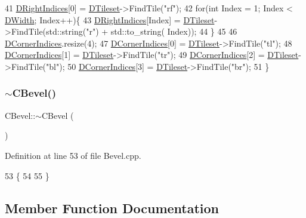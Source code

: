 \begin{DoxyCode}
41     \hyperlink{classCBevel_a52160856e5fbb45c4c1d6e433089ab05}{DRightIndices}[0] = \hyperlink{classCBevel_a98cbd98b79bc8cffd408f12fee447fb9}{DTileset}->FindTile(\textcolor{stringliteral}{"rf"});
42     \textcolor{keywordflow}{for}(\textcolor{keywordtype}{int} Index = 1; Index < \hyperlink{classCBevel_a891dccc1828c48e5e7a475ca33080060}{DWidth}; Index++)\{
43         \hyperlink{classCBevel_a52160856e5fbb45c4c1d6e433089ab05}{DRightIndices}[Index] = \hyperlink{classCBevel_a98cbd98b79bc8cffd408f12fee447fb9}{DTileset}->FindTile(std::string(\textcolor{stringliteral}{"r"}) + std::to\_string(
      Index));
44     \}
45     
46     \hyperlink{classCBevel_ab5e1c6e9de178bdfbdb87796945a289e}{DCornerIndices}.resize(4);
47     \hyperlink{classCBevel_ab5e1c6e9de178bdfbdb87796945a289e}{DCornerIndices}[0] = \hyperlink{classCBevel_a98cbd98b79bc8cffd408f12fee447fb9}{DTileset}->FindTile(\textcolor{stringliteral}{"tl"});
48     \hyperlink{classCBevel_ab5e1c6e9de178bdfbdb87796945a289e}{DCornerIndices}[1] = \hyperlink{classCBevel_a98cbd98b79bc8cffd408f12fee447fb9}{DTileset}->FindTile(\textcolor{stringliteral}{"tr"});
49     \hyperlink{classCBevel_ab5e1c6e9de178bdfbdb87796945a289e}{DCornerIndices}[2] = \hyperlink{classCBevel_a98cbd98b79bc8cffd408f12fee447fb9}{DTileset}->FindTile(\textcolor{stringliteral}{"bl"});
50     \hyperlink{classCBevel_ab5e1c6e9de178bdfbdb87796945a289e}{DCornerIndices}[3] = \hyperlink{classCBevel_a98cbd98b79bc8cffd408f12fee447fb9}{DTileset}->FindTile(\textcolor{stringliteral}{"br"});
51 \}
\end{DoxyCode}
\hypertarget{classCBevel_a52d29ce666c80b29dae9da0307270e68}{}\label{classCBevel_a52d29ce666c80b29dae9da0307270e68} 
\subsubsection{\texorpdfstring{$\sim$\+C\+Bevel()}{~CBevel()}}
{\footnotesize\ttfamily C\+Bevel\+::$\sim$\+C\+Bevel (\begin{DoxyParamCaption}{ }\end{DoxyParamCaption})}



Definition at line 53 of file Bevel.\+cpp.


\begin{DoxyCode}
53                \{
54     
55 \}
\end{DoxyCode}


\subsection{Member Function Documentation}
\hypertarget{classCBevel_a407870821f37aa77621723116e979c4c}{}\label{classCBevel_a407870821f37aa77621723116e979c4c} 
